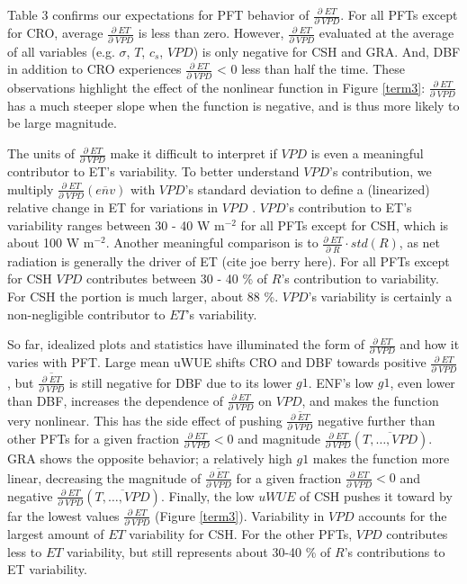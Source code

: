\documentclass[draft,linenumbers]{agujournal}
\begin{document}
Table 3 confirms our expectations for PFT behavior of $\frac{\partial \; ET}{\partial \; VPD}$. For all PFTs except for CRO, average $\frac{\partial \; ET}{\partial \; VPD}$ is less than zero. However, $\frac{\partial \; ET}{\partial \; VPD}$ evaluated at the average of all variables (e.g. $\sigma$, $T$, $c_s$, $VPD$) is only negative for CSH and GRA. And, DBF in addition to CRO experiences $\frac{\partial \; ET}{\partial \; VPD}$ < 0 less than half the time. These observations highlight the effect of the nonlinear function in Figure \ref{term3}: $\frac{\partial \; ET}{\partial \; VPD}$ has a much steeper slope when the function is negative, and is thus more likely to be large magnitude.

The units of $\frac{\partial \; ET}{\partial \; VPD}$ make it difficult to interpret if $VPD$ is even a meaningful contributor to ET's variability. To better understand $VPD$'s contribution, we multiply $\frac{\partial \; ET}{\partial \; VPD}\left(\overline{env}\right)$ with $VPD$'s standard deviation to define a (linearized) relative change in ET for variations in $VPD$ . $VPD$'s contribution to ET's variability ranges between 30 - 40 W m$^{-2}$ for all PFTs except for CSH, which is about 100 W m$^{-2}$. Another meaningful comparison is to $\frac{\partial \; ET}{\partial \; R} \cdot std(R)$, as net radiation is generally the driver of ET (cite joe berry here). For all PFTs except for CSH $VPD$ contributes between 30 - 40 \% of $R$'s contribution to variability. For CSH the portion is much larger, about 88 \%. $VPD$'s variability is certainly a non-negligible contributor to $ET$'s variability.

So far, idealized plots and statistics have illuminated the form of $\frac{\partial \; ET}{\partial \; VPD}$ and how it varies with PFT. Large mean uWUE shifts CRO and DBF towards positive $\frac{\partial \; ET}{\partial \; VPD}$, but $\overline{\frac{\partial \; ET}{\partial \; VPD}}$ is still negative for DBF due to its lower $g1$. ENF's low $g1$, even lower than DBF, increases the dependence of $\frac{\partial \; ET}{\partial \; VPD}$ on $VPD$, and makes the function very nonlinear. This has the side effect of pushing $\overline{\frac{\partial \; ET}{\partial \; VPD}}$ negative further than other PFTs for a given fraction $\frac{\partial \; ET}{\partial \; VPD} < 0$ and magnitude $\frac{\partial \; ET}{\partial \; VPD}(\overline{T,\ldots,VPD})$. GRA shows the opposite behavior; a relatively high $g1$  makes the function more linear, decreasing the magnitude of $\overline{\frac{\partial \; ET}{\partial \; VPD}}$ for a given fraction $\frac{\partial \; ET}{\partial \; VPD} < 0$ and negative $\frac{\partial \; ET}{\partial \; VPD}(\overline{T,\ldots,VPD})$. Finally, the low $uWUE$ of CSH pushes it toward by far the lowest values $\frac{\partial \; ET}{\partial \; VPD}$ (Figure \ref{term3}). Variability in $VPD$ accounts for the largest amount of $ET$ variability for CSH. For the other PFTs, $VPD$ contributes less to $ET$ variability, but still represents about 30-40 \% of $R$'s contributions to ET variability.
\end{document}
